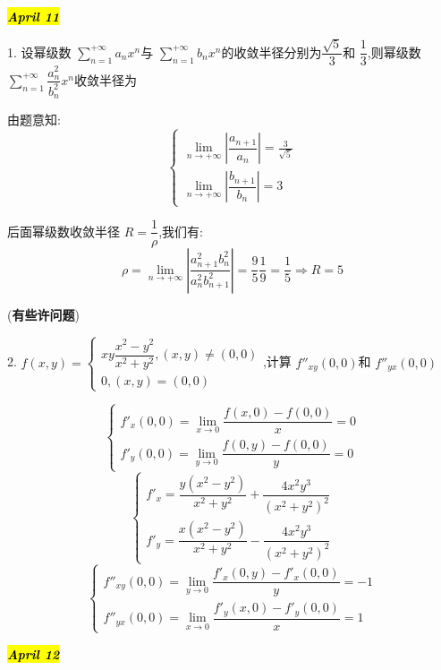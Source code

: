 \hl{\textbf{\textit{April 11}}}

1. 设幂级数 $\sum\limits_{n=1}^{+\infty}a_{n}x^{n}$与 $\sum\limits_{n=1}^{+\infty}b_{n}x^{n}$的收敛半径分别为$\dfrac{\sqrt{5}}{3}$和 $\dfrac{1}{3}$,则幂级数 $\sum\limits_{n=1}^{+\infty}\dfrac{a_{n}^{2}}{b_{n}^{2}}x^{n}$收敛半径为
\begin{solution}
	由题意知: 
	$$\left\lbrace 
	\begin{array}{l}
		\lim\limits_{n\rightarrow+\infty}|\dfrac{a_{n+1}}{a_{n}}|=\frac{3}{\sqrt{5}}\\
		\lim\limits_{n\rightarrow+\infty}|\dfrac{b_{n+1}}{b_{n}}|=3
	\end{array}
	\right. $$
	
	后面幂级数收敛半径 $R=\dfrac{1}{\rho}$,我们有: 
	$$\rho=\lim\limits_{n\rightarrow+\infty}|\frac{a^{2}_{n+1}b_{n}^{2}}{a^{2}_{n}b_{n+1}^{2}}|=\frac{9}{5}\frac{1}{9}=\frac{1}{5}\Rightarrow R=5$$
	
	(\textbf{有些许问题})
\end{solution}

2. $f(x,y)=\left\lbrace
\begin{array}{l}
	xy\dfrac{x^2-y^2}{x^2+y^2},(x,y)\neq (0,0)\\
	0,(x,y)=(0,0)
\end{array} \right. $,计算 $f''_{xy}(0,0)$和 $f''_{yx}(0,0)$
\begin{solution}
	$$\left\lbrace
	\begin{array}{l}
		f'_{x}(0,0)=\lim\limits_{x\rightarrow 0}\dfrac{f(x,0)-f(0,0)}{x}=0\\
		f'_{y}(0,0)=\lim\limits_{y\rightarrow 0}\dfrac{f(0,y)-f(0,0)}{y}=0
	\end{array}
	\right. $$
	$$\left\lbrace 
	\begin{array}{l}
		f'_{x}=\dfrac{y(x^2-y^2)}{x^2+y^2}+\dfrac{4x^2y^3}{(x^2+y^2)^2}\\
		f'_{y}=\dfrac{x(x^2-y^2)}{x^2+y^2}-\dfrac{4x^2y^3}{(x^2+y^2)^2}
	\end{array}
	\right. $$
	$$\left\lbrace
	\begin{array}{l}
		f''_{xy}(0,0)=\lim\limits_{y\rightarrow 0}\dfrac{f'_{x}(0,y)-f'_{x}(0,0)}{y}=-1\\
		f''_{yx}(0,0)=\lim\limits_{x\rightarrow 0}\dfrac{f'_{y}(x,0)-f'_{y}(0,0)}{x}=1
	\end{array}
	\right. $$
\end{solution}

\hl{\textbf{\textit{April 12}}}

